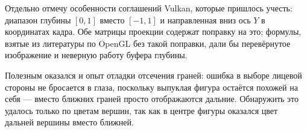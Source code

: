 \documentclass[14pt,a4paper]{extarticle}
\begin{document}
Отдельно отмечу особенности соглашений Vulkan, которые пришлось учесть:
диапазон глубины $[0, 1]$ вместо $[-1, 1]$ и направленная вниз ось $Y$ в
координатах кадра. Обе матрицы проекции содержат поправку на это; формулы,
взятые из литературы по OpenGL без такой поправки, дали бы перевёрнутое
изображение и неверную работу буфера глубины.

Полезным оказался и опыт отладки отсечения граней: ошибка в выборе лицевой
стороны не бросается в глаза, поскольку выпуклая фигура остаётся похожей на
себя — вместо ближних граней просто отображаются дальние. Обнаружить это
удалось только по цветам вершин, так как в центре фигуры оказался цвет дальней
вершины вместо ближней.
\end{document}
